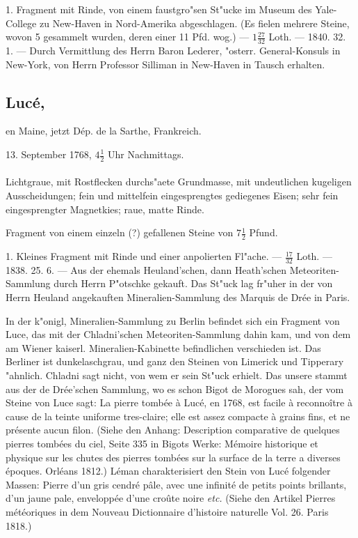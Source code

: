 \documentclass[a4paper, 11pt, oneside, polutonikogreek, german]{article}
\begin{document}
1. Fragment mit Rinde, von einem faustgro"sen St"ucke im Museum des Yale-College zu New-Haven in Nord-Amerika abgeschlagen. (Es fielen mehrere Steine, wovon 5 gesammelt wurden, deren einer 11 Pfd. wog.) --- $1\frac{27}{32}$ Loth. --- 1840. 32. 1. --- Durch Vermittlung des Herrn Baron Lederer, "osterr. General-Konsuls in New-York, von Herrn Professor Silliman in New-Haven in Tausch erhalten.
\subsection[Lucé.]{Lucé,}
\begin{center}
\small
en Maine, jetzt Dép. de la Sarthe, Frankreich.

13. September 1768, $4\frac{1}{2}$ Uhr Nachmittags.
\end{center}
\paragraph{}
Lichtgraue, mit Rostflecken durchs"aete Grundmasse, mit undeutlichen kugeligen Ausscheidungen; fein und mittelfein eingesprengtes gediegenes Eisen; sehr fein eingesprengter Magnetkies; raue, matte Rinde.

Fragment von einem einzeln (?) gefallenen Steine von $7\frac{1}{2}$ Pfund.

1. Kleines Fragment mit Rinde und einer anpolierten Fl"ache. --- $\frac{17}{32}$ Loth. --- 1838. 25. 6. --- Aus der ehemals Heuland'schen, dann Heath'schen Meteoriten-Sammlung durch Herrn P"otschke gekauft. Das St"uck lag fr"uher in der von Herrn Heuland angekauften Mineralien-Sammlung des Marquis de Drée in Paris.

\setlength{\leftskip}{10mm}
\setlength{\parindent}{0pt}

{\footnotesize In der k"onigl, Mineralien-Sammlung zu Berlin befindet sich ein Fragment von Luce, das mit der Chladni'schen Meteoriten-Sammlung dahin kam, und von dem am Wiener kaiserl. Mineralien-Kabinette befindlichen verschieden ist. Das Berliner ist dunkelaschgrau, und ganz den Steinen von Limerick und Tipperary "ahnlich. Chladni sagt nicht, von wem er sein St"uck erhielt. Das unsere stammt aus der de Drée'schen Sammlung, wo es schon Bigot de Morogues sah, der vom Steine von Luce sagt: La pierre tombée à Lucé, en 1768, est facile à reconnoître à cause de la teinte uniforme tres-claire; elle est assez compacte à grains fins, et ne présente aucun filon. (Siehe den Anhang: Description comparative de quelques pierres tombées du ciel, Seite 335 in Bigots Werke: Mémoire historique et physique sur les chutes des pierres tombées sur la surface de la terre a diverses époques. Orléans 1812.) Léman charakterisiert den Stein von Lucé folgender Massen: Pierre d’un gris cendré pâle, avec une infinité de petits points brillants, d'un jaune pale, enveloppée d'une croûte noire \emph{etc.} (Siehe den Artikel Pierres météoriques in dem Nouveau Dictionnaire d'histoire naturelle Vol. 26. Paris 1818.)}
\end{document}
